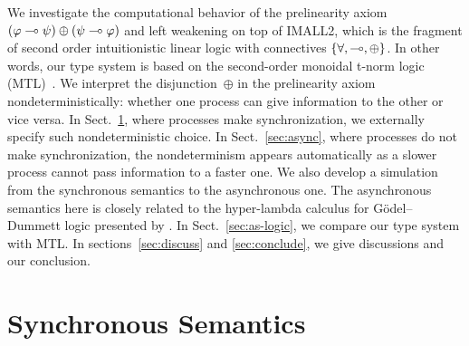We investigate the computational behavior of the prelinearity axiom
$(\varphi\multimap\psi)\oplus(\psi\multimap\varphi)$ and left weakening
on top of IMALL2, which is the fragment of second order
intuitionistic linear logic with connectives $\{\forall, \multimap,
\oplus\}$.  In other words, our type system is based on the second-order
monoidal t-norm logic (MTL)~\citep{Esteva2001271}.
We interpret the disjunction~$\oplus$ in the prelinearity axiom
nondeterministically: whether
one process can give information to the other or
vice versa.
In Sect.~\ref{sec:sync}, where processes make synchronization,
we externally specify such nondeterministic choice.
In Sect.~\ref{sec:async}, where processes do not make synchronization,
the nondeterminism appears automatically as a slower process cannot pass
information to a faster one.
%
We also
develop a simulation from the synchronous semantics to the
asynchronous one.
The asynchronous semantics here is closely related to
the hyper-lambda calculus for G\"odel--Dummett logic presented by
\citet{hiraiflops2012}.
%
In Sect.~\ref{sec:as-logic}, we compare our type system with MTL.
In sections~\ref{sec:discuss} and \ref{sec:conclude}, we give discussions
and our conclusion.

\section{Synchronous Semantics}
\label{sec:sync}

